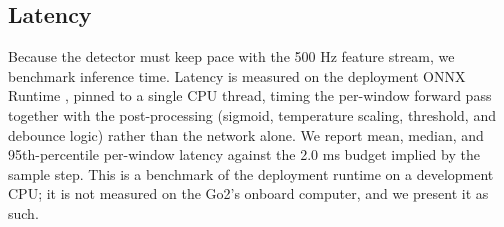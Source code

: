 \subsection{Latency}
Because the detector must keep pace with the 500 Hz feature stream, we benchmark inference time. Latency is measured on the deployment ONNX Runtime \cite{onnxruntime}, pinned to a single CPU thread, timing the per-window forward pass together with the post-processing (sigmoid, temperature scaling, threshold, and debounce logic) rather than the network alone. We report mean, median, and 95th-percentile per-window latency against the 2.0 ms budget implied by the sample step. This is a benchmark of the deployment runtime on a development CPU; it is not measured on the Go2's onboard computer, and we present it as such.
